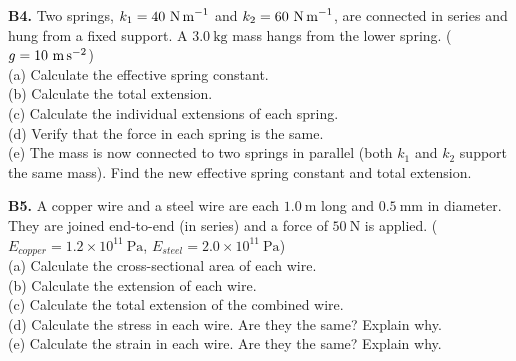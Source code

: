 \begin{exercisebox}[9]
\vspace{0.4cm}

\textbf{B4.} Two springs, $k_1 = 40\ \text{N\,m}^{-1}$
and $k_2 = 60\ \text{N\,m}^{-1}$, are connected in
series and hung from a fixed support. A $3.0\ \text{kg}$
mass hangs from the lower spring.
($g = 10\ \text{m\,s}^{-2}$)\\[4pt]
(a) Calculate the effective spring constant.\\
(b) Calculate the total extension.\\
(c) Calculate the individual extensions of each
spring.\\
(d) Verify that the force in each spring is the same.\\
(e) The mass is now connected to two springs in
parallel (both $k_1$ and $k_2$ support the same mass).
Find the new effective spring constant and total
extension.
\hfill{}

\vspace{0.4cm}

\textbf{B5.} A copper wire and a steel wire are each
$1.0\ \text{m}$ long and $0.5\ \text{mm}$ in diameter.
They are joined end-to-end (in series) and a force
of $50\ \text{N}$ is applied.
($E_{copper} = 1.2\times10^{11}\ \text{Pa}$,
$E_{steel} = 2.0\times10^{11}\ \text{Pa}$)\\[4pt]
(a) Calculate the cross-sectional area of each wire.\\
(b) Calculate the extension of each wire.\\
(c) Calculate the total extension of the combined wire.\\
(d) Calculate the stress in each wire. Are they the
same? Explain why.\\
(e) Calculate the strain in each wire. Are they the
same? Explain why.
\hfill{}

\end{exercisebox}
